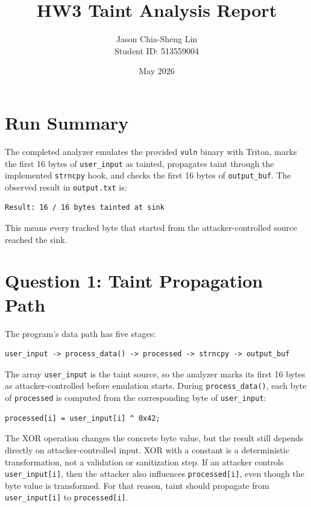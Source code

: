 \documentclass[11pt]{article}
\title{HW3 Taint Analysis Report}
\author{Jason Chia-Sheng Lin\\Student ID: 513559004}
\date{May 2026}
\begin{document}
\maketitle

\section*{Run Summary}

The completed analyzer emulates the provided \texttt{vuln} binary with Triton,
marks the first 16 bytes of \texttt{user\_input} as tainted, propagates taint
through the implemented \texttt{strncpy} hook, and checks the first 16 bytes of
\texttt{output\_buf}. The observed result in \texttt{output.txt} is:

\begin{lstlisting}
Result: 16 / 16 bytes tainted at sink
\end{lstlisting}

This means every tracked byte that started from the attacker-controlled source
reached the sink.

\section*{Question 1: Taint Propagation Path}

The program's data path has five stages:

\begin{lstlisting}
user_input -> process_data() -> processed -> strncpy -> output_buf
\end{lstlisting}

The array \texttt{user\_input} is the taint source, so the analyzer marks its
first 16 bytes as attacker-controlled before emulation starts. During
\texttt{process\_data()}, each byte of \texttt{processed} is computed from the
corresponding byte of \texttt{user\_input}:

\begin{lstlisting}
processed[i] = user_input[i] ^ 0x42;
\end{lstlisting}

The XOR operation changes the concrete byte value, but the result still depends
directly on attacker-controlled input. XOR with a constant is a deterministic
transformation, not a validation or sanitization step. If an attacker controls
\texttt{user\_input[i]}, then the attacker also influences
\texttt{processed[i]}, even though the byte value is transformed. For that
reason, taint should propagate from \texttt{user\_input[i]} to
\texttt{processed[i]}.
\end{document}
